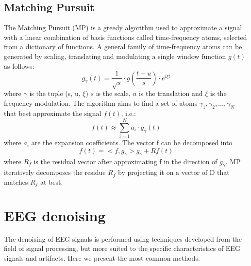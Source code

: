 \documentclass[a4paper]{sapthesis}
\begin{document}
\subsection{Matching Pursuit}\label{sec:mp}
The Matching Pursuit (MP)\cite{mp} is a greedy algorithm used to approximate a
signal with a linear combination of basis functions called time-frequency 
atoms, selected from a dictionary of functions. \newline
A general family of time-frequency atoms can be generated by scaling, translating 
and modulating a single window function $g(t)$ as follows:
\begin{equation}
\label{eq:mp}
g_{\gamma}(t) = \frac{1}{\sqrt{s}} \cdot g(\frac{t-u}{s}) \cdot e^{i\xi t}
\end{equation}
where $\gamma$ is the tuple (s, u, $\xi$) $s$ is the scale, $u$ is the
translation and $\xi$ is the frequency modulation. \newline
The algorithm aims to find a set of atoms $\gamma_1, \gamma_2, \dots, \gamma_N$
that best approximate the signal $f(t)$, i.e.:
\begin{equation}
\label{eq:mp2}
f(t) \approx \sum_{i=1}^{N} a_i \cdot g_{\gamma}(t)
\end{equation}
where $a_i$ are the expansion coefficients. \newline
The vector f can be decomposed into 
\begin{equation}
\label{eq:mp3}
f(t) = <f, g_{\gamma}>g_{\gamma} + Rf(t)
\end{equation}
where $R_{f}$ is the residual vector after approximating f in the direction
 of $g_{\gamma}$. \newline
MP iteratively decomposes the residue $R_{f}$  by projecting it on a vector
of D that matches $R_{f}$ at best. \newline
\section{EEG denoising}\label{sec:denoising}
The denoising of EEG signals is performed using techniques developed from
the field of signal processing, but more suited to the specific characteristics
of EEG signals and artifacts. Here we present the most common methods.
\end{document}
